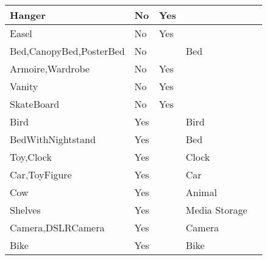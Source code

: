 \documentclass{article}
\begin{document}
\begin{longtable}{|l|l|l|l|l|}
Hanger                                   & No               & Yes                            &                &                             \\ \hline
Easel                                    & No               & Yes                            &                &                             \\ \hline
Bed,CanopyBed,PosterBed                  & No               &                                & Bed            &                             \\ \hline
Armoire,Wardrobe                         & No               & Yes                            &                &                             \\ \hline
Vanity                                   & No               & Yes                            &                &                             \\ \hline
SkateBoard                               & No               & Yes                            &                &                             \\ \hline
Bird                                     & Yes              &                                & Bird           &                             \\ \hline
BedWithNightstand                        & Yes              &                                & Bed            &                             \\ \hline
Toy,Clock                                & Yes              &                                & Clock          &                             \\ \hline
Car,ToyFigure                            & Yes              &                                & Car            &                             \\ \hline
Cow                                      & Yes              &                                & Animal         &                             \\ \hline
Shelves                                  & Yes              &                                & Media Storage  &                             \\ \hline
Camera,DSLRCamera                        & Yes              &                                & Camera         &                             \\ \hline
Bike                                     & Yes              &                                & Bike           &                             \\ \hline

\end{longtable}
\end{document}
